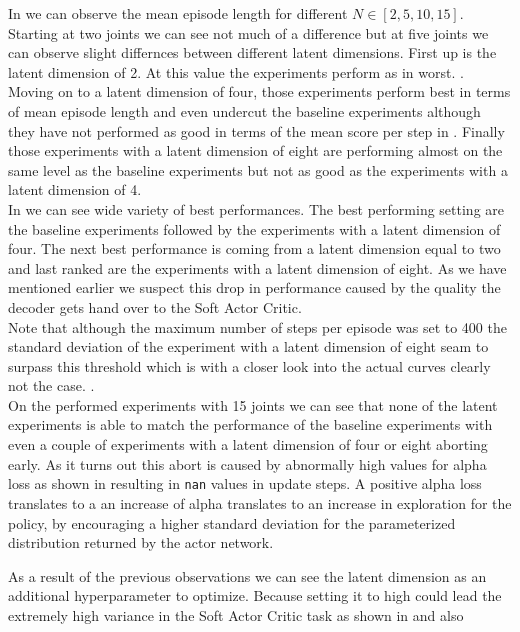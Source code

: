 In  we can observe the mean episode length for different $N \in [2, 5, 10, 15]$. Starting at two joints we can see not much of a difference but at five joints we can observe slight differnces between different latent dimensions. First up is the latent dimension of 2. At this value the experiments perform as in  worst. .\\
Moving on to a latent dimension of four, those experiments perform best in terms of mean episode length and even undercut the baseline experiments although they have not performed as good in terms of the mean score per step in . Finally those experiments with a latent dimension of eight are performing almost on the same level as the baseline experiments but not as good as the experiments with a latent dimension of 4. \\
In  we can see wide variety of best performances. The best performing setting are the baseline experiments followed by the experiments with a latent dimension of four. The next best performance is coming from a latent dimension equal to two and last ranked are the experiments with a latent dimension of eight. As we have mentioned earlier we suspect this drop in performance caused by the quality the decoder gets hand over to the Soft Actor Critic. \\
Note that although the maximum number of steps per episode was set to 400 the standard deviation of the experiment with a latent dimension of eight seam to surpass this threshold which is with a closer look into the actual curves clearly not the case. . \\ 
On the performed experiments with 15 joints we can see that none of the latent experiments is able to match the performance of the baseline experiments with even a couple of experiments with a latent dimension of four or eight aborting early. As it turns out this abort is caused by abnormally high values for alpha loss as shown in  resulting in \texttt{nan} values in update steps. A positive alpha loss translates to a an increase of alpha translates to an increase in exploration for the policy, by encouraging a higher standard deviation for the parameterized distribution returned by the actor network. 

As a result of the previous observations we can see the latent dimension as an additional hyperparameter to optimize. Because setting it to high could lead the extremely high variance in the Soft Actor Critic task as shown in  and also


